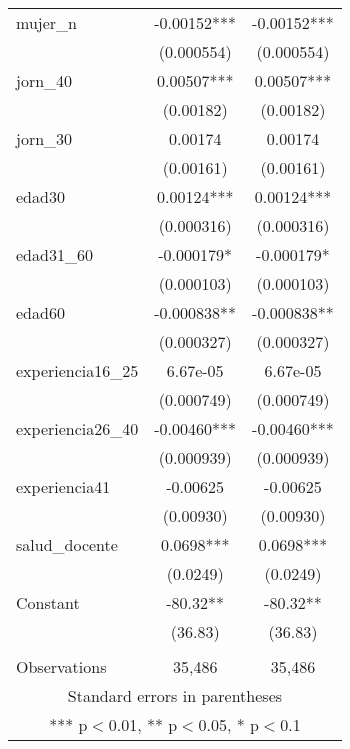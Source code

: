 \documentclass[]{article}
\begin{document}
\begin{tabular}{lcc}
mujer\_n & -0.00152*** & -0.00152*** \\
 & (0.000554) & (0.000554) \\
jorn\_40 & 0.00507*** & 0.00507*** \\
 & (0.00182) & (0.00182) \\
jorn\_30 & 0.00174 & 0.00174 \\
 & (0.00161) & (0.00161) \\
edad30 & 0.00124*** & 0.00124*** \\
 & (0.000316) & (0.000316) \\
edad31\_60 & -0.000179* & -0.000179* \\
 & (0.000103) & (0.000103) \\
edad60 & -0.000838** & -0.000838** \\
 & (0.000327) & (0.000327) \\
experiencia16\_25 & 6.67e-05 & 6.67e-05 \\
 & (0.000749) & (0.000749) \\
experiencia26\_40 & -0.00460*** & -0.00460*** \\
 & (0.000939) & (0.000939) \\
experiencia41 & -0.00625 & -0.00625 \\
 & (0.00930) & (0.00930) \\
salud\_docente & 0.0698*** & 0.0698*** \\
 & (0.0249) & (0.0249) \\
Constant & -80.32** & -80.32** \\
 & (36.83) & (36.83) \\
 &  &  \\
 Observations & 35,486 & 35,486 \\ \hline
\multicolumn{3}{c}{ Standard errors in parentheses} \\
\multicolumn{3}{c}{ *** p$<$0.01, ** p$<$0.05, * p$<$0.1} \\
\end{tabular}
\end{document}
